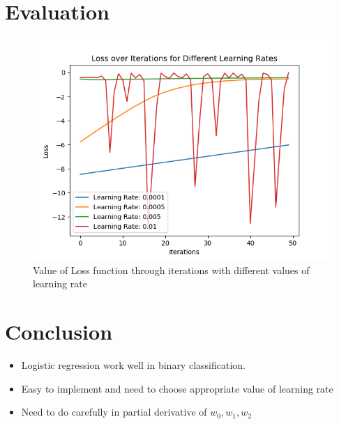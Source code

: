 \documentclass{article}
\begin{document}
\section{Evaluation}
\begin{figure}
    \centering
    \includegraphics[width=0.75\linewidth]{01.png}
    \caption{Value of Loss function through iterations with different values of learning rate}
    \label{fig:enter-label}
\end{figure}

\section{Conclusion}
\begin{itemize}
\item Logistic regression work well in binary classification. 
\item Easy to implement and need to choose appropriate value of learning rate
\item Need to do carefully in partial derivative of \(w_0, w_1, w_2\)
\end{itemize}
\end{document}

